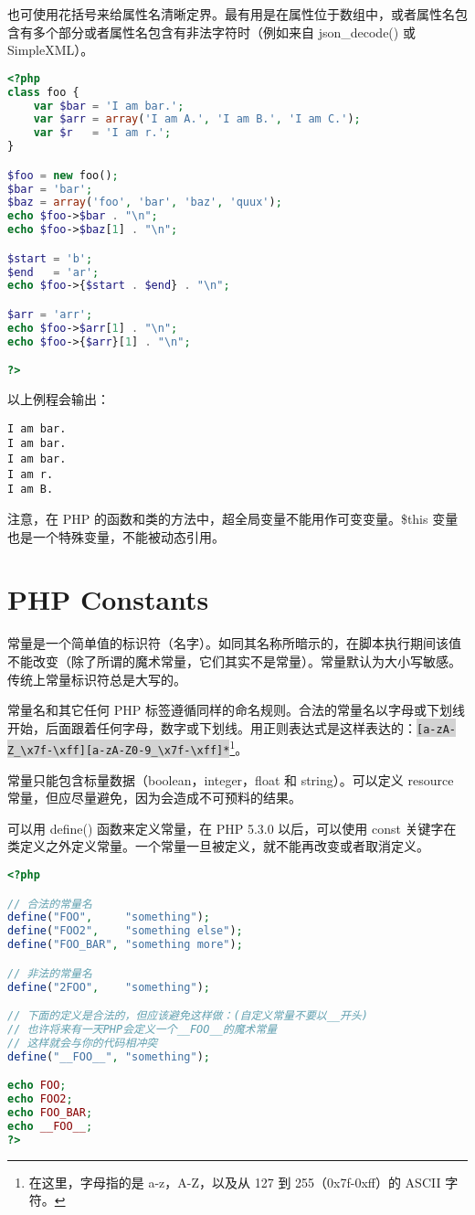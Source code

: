 也可使用花括号来给属性名清晰定界。最有用是在属性位于数组中，或者属性名包含有多个部分或者属性名包含有非法字符时（例如来自 json\_decode() 或 SimpleXML）。




\begin{lstlisting}[language=PHP]
<?php
class foo {
    var $bar = 'I am bar.';
    var $arr = array('I am A.', 'I am B.', 'I am C.');
    var $r   = 'I am r.';
}

$foo = new foo();
$bar = 'bar';
$baz = array('foo', 'bar', 'baz', 'quux');
echo $foo->$bar . "\n";
echo $foo->$baz[1] . "\n";

$start = 'b';
$end   = 'ar';
echo $foo->{$start . $end} . "\n";

$arr = 'arr';
echo $foo->$arr[1] . "\n";
echo $foo->{$arr}[1] . "\n";

?>
\end{lstlisting}


以上例程会输出：

\begin{verbatim}
I am bar.
I am bar.
I am bar.
I am r.
I am B.
\end{verbatim}

注意，在 PHP 的函数和类的方法中，超全局变量不能用作可变变量。\$this 变量也是一个特殊变量，不能被动态引用。


\chapter{PHP Constants}

常量是一个简单值的标识符（名字）。如同其名称所暗示的，在脚本执行期间该值不能改变（除了所谓的魔术常量，它们其实不是常量）。常量默认为大小写敏感。传统上常量标识符总是大写的。

常量名和其它任何 PHP 标签遵循同样的命名规则。合法的常量名以字母或下划线开始，后面跟着任何字母，数字或下划线。用正则表达式是这样表达的：\colorbox{lightgray}{\texttt{[a-zA-Z\_\textbackslash x7f-\textbackslash xff][a-zA-Z0-9\_\textbackslash x7f-\textbackslash xff]*}}\footnote{在这里，字母指的是 a-z，A-Z，以及从 127 到 255（0x7f-0xff）的 ASCII 字符。}。

常量只能包含标量数据（boolean，integer，float 和 string）。可以定义 resource 常量，但应尽量避免，因为会造成不可预料的结果。

可以用 define() 函数来定义常量，在 PHP 5.3.0 以后，可以使用 const 关键字在类定义之外定义常量。一个常量一旦被定义，就不能再改变或者取消定义。

\begin{lstlisting}[language=PHP]
<?php

// 合法的常量名
define("FOO",     "something");
define("FOO2",    "something else");
define("FOO_BAR", "something more");

// 非法的常量名
define("2FOO",    "something");

// 下面的定义是合法的，但应该避免这样做：(自定义常量不要以__开头)
// 也许将来有一天PHP会定义一个__FOO__的魔术常量
// 这样就会与你的代码相冲突
define("__FOO__", "something");

echo FOO;
echo FOO2;
echo FOO_BAR;
echo __FOO__;
?>
\end{lstlisting}


